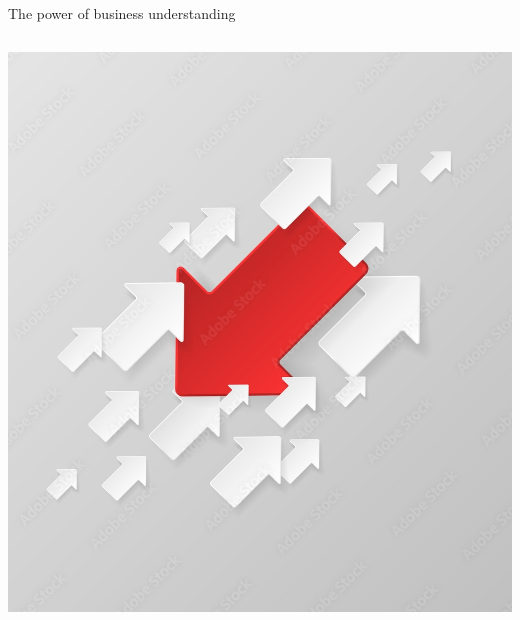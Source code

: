 \documentclass[8pt]{beamer}
\begin{document}
\begin{frame}{The power of business understanding}
\begin{columns}
\begin{column}{.6\textwidth}
                    \includegraphics[height=.7\textheight]{pics/wrong.jpg}
                \end{column}
            \end{columns}
        \end{frame}
\end{document}

